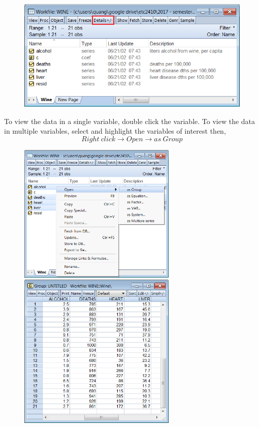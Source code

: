 \documentclass[12pt]{report}
\begin{document}
			\begin{figure}[H]
				\centering
				\includegraphics[width = 1\textwidth]{wf1}
			\end{figure}
			\vspace{-\baselineskip}
			\noindent
			To view the data in a single variable, double click the variable. To view the data in multiple variables, select and highlight the variables of interest then,
			$$Right\ click \to Open \to as\ Group$$
			\begin{figure}[H]
				\centering
				\includegraphics[width=0.67\textwidth]{group1}
				\includegraphics[width=0.67\textwidth]{group2}
			\end{figure}
	\newpage	
\end{document}
